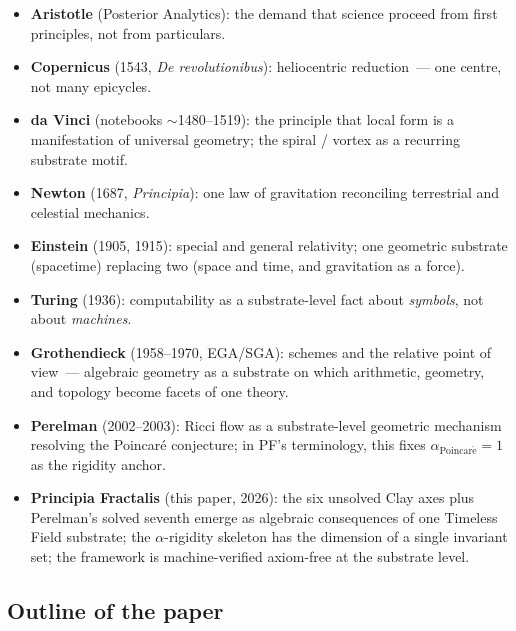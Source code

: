 \documentclass[11pt,a4paper]{article}
\theoremstyle{definition}
\theoremstyle{remark}
\newcommand{\alphaP}{\alpha_{\mathrm{Poincar\acute{e}}}}
\begin{document}
\begin{itemize}
\item \textbf{Aristotle} (Posterior Analytics): the demand that
science proceed from first principles, not from particulars.
\item \textbf{Copernicus} (1543, \emph{De revolutionibus}):
heliocentric reduction~--- one centre, not many epicycles.
\item \textbf{da Vinci} (notebooks $\sim$1480--1519): the
principle that local form is a manifestation of universal
geometry; the spiral / vortex as a recurring substrate motif.
\item \textbf{Newton} (1687, \emph{Principia}): one law of
gravitation reconciling terrestrial and celestial mechanics.
\item \textbf{Einstein} (1905, 1915): special and general
relativity; one geometric substrate (spacetime) replacing two
(space and time, and gravitation as a force).
\item \textbf{Turing} (1936): computability as a substrate-level
fact about \emph{symbols}, not about \emph{machines}.
\item \textbf{Grothendieck} (1958--1970, EGA/SGA): schemes and
the relative point of view~--- algebraic geometry as a substrate
on which arithmetic, geometry, and topology become facets of one
theory.
\item \textbf{Perelman} (2002--2003): Ricci flow as a substrate-level
geometric mechanism resolving the Poincar\'e conjecture; in PF's
terminology, this fixes $\alphaP = 1$ as the rigidity anchor.
\item \textbf{Principia Fractalis} (this paper, 2026): the six
unsolved Clay axes plus Perelman's solved seventh emerge as
algebraic consequences of one Timeless Field substrate; the
$\alpha$-rigidity skeleton has the dimension of a single
invariant set; the framework is machine-verified axiom-free at the
substrate level.
\end{itemize}

\subsection{Outline of the paper}
\end{document}
